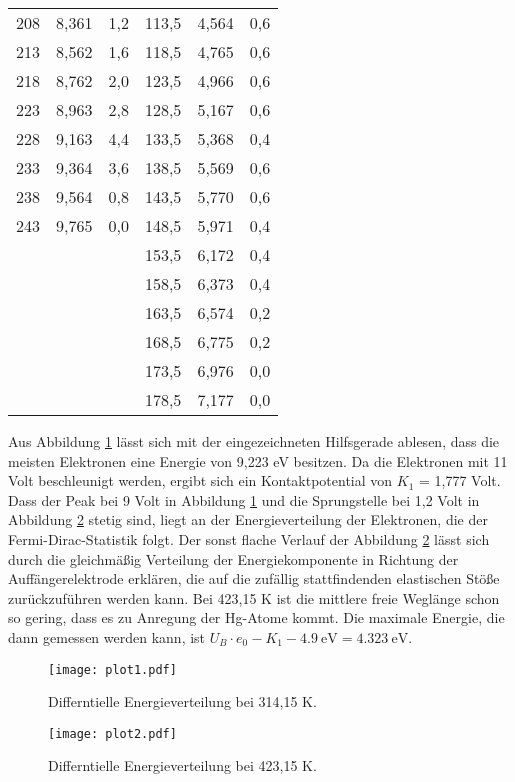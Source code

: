 \begin{table}
\begin{tabular}{c c c | c c c}
    208 & 8,361  & 1,2 & 113,5 & 4,564 & 0,6 \\
    213 & 8,562  & 1,6 & 118,5 & 4,765 & 0,6 \\
    218 & 8,762  & 2,0 & 123,5 & 4,966 & 0,6 \\
    223 & 8,963  & 2,8 & 128,5 & 5,167 & 0,6 \\
    228 & 9,163  & 4,4 & 133,5 & 5,368 & 0,4 \\
    233 & 9,364  & 3,6 & 138,5 & 5,569 & 0,6 \\
    238 & 9,564  & 0,8 & 143,5 & 5,770 & 0,6 \\
    243 & 9,765  & 0,0 & 148,5 & 5,971 & 0,4 \\
        &        &     & 153,5 & 6,172 & 0,4 \\
        &        &     & 158,5 & 6,373 & 0,4 \\
        &        &     & 163,5 & 6,574 & 0,2 \\
        &        &     & 168,5 & 6,775 & 0,2 \\
        &        &     & 173,5 & 6,976 & 0,0 \\
        &        &     & 178,5 & 7,177 & 0,0 \\

    \bottomrule
  \end{tabular}
\end{table}
Aus Abbildung \ref{fig:plot1} lässt sich mit der eingezeichneten Hilfsgerade ablesen, dass die meisten Elektronen eine Energie von 9,223 eV besitzen.
Da die Elektronen mit 11 Volt beschleunigt werden, ergibt sich ein Kontaktpotential von $K_1$ = 1,777 Volt.
Dass der Peak bei 9 Volt in Abbildung \ref{fig:plot1} und die Sprungstelle bei 1,2 Volt in Abbildung \ref{fig:plot2} stetig sind, liegt an der Energieverteilung der Elektronen, die der Fermi-Dirac-Statistik folgt.
Der sonst flache Verlauf der Abbildung \ref{fig:plot2} lässt sich durch die gleichmäßig Verteilung der Energiekomponente in Richtung der Auffängerelektrode erklären, die auf die zufällig stattfindenden elastischen Stöße zurückzuführen werden kann.
Bei 423,15 K ist die mittlere freie Weglänge schon so gering, dass es zu Anregung der Hg-Atome kommt.
Die maximale Energie, die dann gemessen werden kann, ist $U_B \cdot e_0 - K_1 - \SI{4.9}{\eV} = \SI{4.323}{\eV}$.
\begin{figure}
  \centering
  \texttt{[image: plot1.pdf]}
  \caption{Differntielle Energieverteilung bei 314,15 K.}
  \label{fig:plot1}
\end{figure}
\begin{figure}
  \centering
  \texttt{[image: plot2.pdf]}
  \caption{Differntielle Energieverteilung bei 423,15 K.}
  \label{fig:plot2}
\end{figure}
\FloatBarrier

